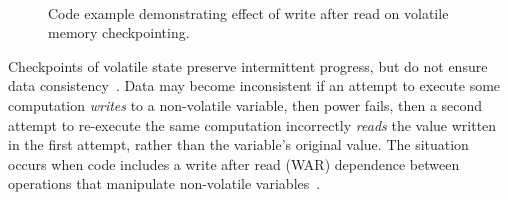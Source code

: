 \begin{figure}
	\centering
	\\
	\caption{Code example demonstrating effect of write after read on volatile memory checkpointing.}
	\label{fig:code_demo_incosistency}
\end{figure}

Checkpoints of volatile state preserve intermittent progress, but do not ensure data consistency~\cite{dino,chain,ratchet}. Data may become inconsistent if an attempt to execute some computation {\em writes} to a non-volatile variable, then power fails, then a second attempt to re-execute the same computation incorrectly {\em reads} the value written in the first attempt, rather than the variable's original value.  The situation occurs when code includes a write after read (WAR) dependence between operations that manipulate non-volatile variables~\cite{ratchet,dino,alpaca}.

